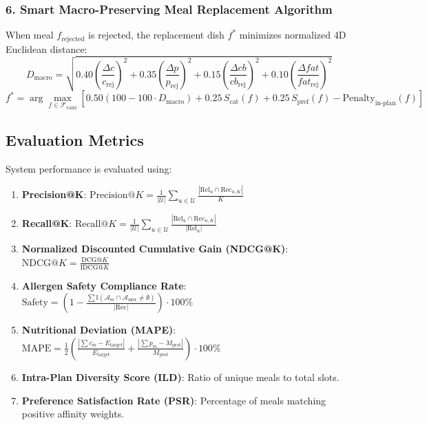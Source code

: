 \documentclass[12pt,a4paper]{report}
\begin{document}
\subsubsection{6. Smart Macro-Preserving Meal Replacement Algorithm}
When meal $f_{\text{rejected}}$ is rejected, the replacement dish $f^*$ minimizes normalized 4D Euclidean distance:
\begin{equation}
D_{\text{macro}} = \sqrt{0.40\left(\frac{\Delta c}{c_{\text{rej}}}\right)^2 + 0.35\left(\frac{\Delta p}{p_{\text{rej}}}\right)^2 + 0.15\left(\frac{\Delta cb}{cb_{\text{rej}}}\right)^2 + 0.10\left(\frac{\Delta fat}{fat_{\text{rej}}}\right)^2}
\end{equation}
\begin{equation}
f^* = \arg\max_{f \in \mathcal{F}_{\text{valid}}} \left[ 0.50(100 - 100 \cdot D_{\text{macro}}) + 0.25\,S_{\text{cat}}(f) + 0.25\,S_{\text{pref}}(f) - \text{Penalty}_{\text{in-plan}}(f) \right]
\end{equation}

\subsection{Evaluation Metrics}
System performance is evaluated using:
\begin{enumerate}
    \item \textbf{Precision@K}: $\text{Precision@}K = \frac{1}{|\mathcal{U}|} \sum_{u \in \mathcal{U}} \frac{|\text{Rel}_u \cap \text{Rec}_{u, K}|}{K}$
    \item \textbf{Recall@K}: $\text{Recall@}K = \frac{1}{|\mathcal{U}|} \sum_{u \in \mathcal{U}} \frac{|\text{Rel}_u \cap \text{Rec}_{u, K}|}{|\text{Rel}_u|}$
    \item \textbf{Normalized Discounted Cumulative Gain (NDCG@K)}: $\text{NDCG@}K = \frac{\text{DCG@}K}{\text{IDCG@}K}$
    \item \textbf{Allergen Safety Compliance Rate}: $\text{Safety} = \left( 1 - \frac{\sum \mathbb{I}(\mathcal{A}_m \cap \mathcal{A}_{\text{user}} \neq \emptyset)}{|\text{Rec}|} \right) \cdot 100\%$
    \item \textbf{Nutritional Deviation (MAPE)}: $\text{MAPE} = \frac{1}{2}\left( \frac{|\sum c_m - E_{\text{target}}|}{E_{\text{target}}} + \frac{|\sum p_m - M_{\text{prot}}|}{M_{\text{prot}}} \right) \cdot 100\%$
    \item \textbf{Intra-Plan Diversity Score (ILD)}: Ratio of unique meals to total slots.
    \item \textbf{Preference Satisfaction Rate (PSR)}: Percentage of meals matching positive affinity weights.
\end{enumerate}
\end{document}
